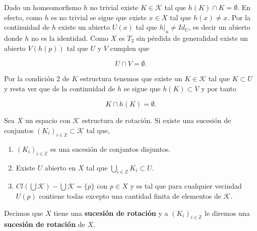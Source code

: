 \begin{ob}\label{ob:K_sep_por_hom} \label{ob:K_separado_por_homeos}
Dado un homeomorfismo $h$ no trivial existe $K \in \mathcal{K}$ tal que $h(K) \cap K = \emptyset.$ En efecto, como $h$ es no trivial se sigue que existe $x \in X$ tal que $h(x) \neq x.$ Por la continuidad de $h$ existe un abierto $U(x)$ tal que $h|_u \neq Id_U$, es decir un abierto donde $h$ no es la identidad. Como $X$ es $T_2$ sin pérdida de generalidad existe un abierto $V(h(p))$ tal que $U$ y $V$ cumplen que 

$$U \cap V = \emptyset.$$

Por la condición 2 de $K$ estructura tenemos que existe un $K \in \mathcal{K}$ tal que $K \subset U$ y resta ver que de la continuidad de $h$ se sigue que $h(K) \subset V$ y por tanto 

$$K \cap h(K) = \emptyset.$$
\end{ob}


\begin{df}\label{df:Suc_rot}
Sea $X$ un espacio con $\mathcal{K}$ estructura de rotación. Si existe una sucesión de conjuntos $(K_i)_{i\in \mathbb{Z}} \subset \mathcal{K}$ tal que,
\begin{enumerate}
\item $(K_i)_{i\in \mathbb{Z}}$ es una sucesión de conjuntos disjuntos. 
\item Existe $U$ abierto en $X$ tal que $\bigcup_{i\in \mathbb{Z}} K_i \subset U$.
\item $Cl(\bigcup \mathcal{K})- \bigcup \mathcal{K}=\{p \}$ con $p \in X$ y es tal que para cualquier vecindad $U(p)$ contiene todas excepto una cantidad finita de elementos de $\mathcal{K}.$

\end{enumerate}
Decimos que $X$ tiene una \textbf{sucesión de rotación} y a $(K_i)_{i\in \mathbb{Z}}$ le diremos una \textbf{sucesión de rotación} de $X$.

\end{df}


